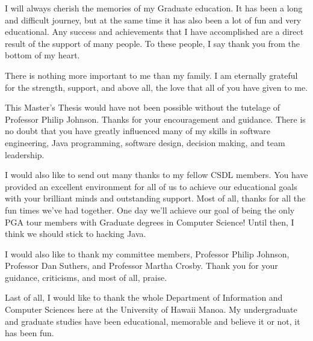 
\begin{acknowledgments}  
I will always cherish the memories of my Graduate education. It has been
a long and difficult journey, but at the same time it has also been a lot
of fun and very educational. Any success and achievements that I have
accomplished are a direct result of the support of many people. To these
people, I say thank you from the bottom of my heart.

There is nothing more important to me than my family. I am eternally
grateful for the strength, support, and above all, the love that all of you
have given to me.

This Master's Thesis would have not been possible without the tutelage of
Professor Philip Johnson. Thanks for your encouragement and guidance. There
is no doubt that you have greatly influenced many of my skills in software
engineering, Java programming, software design, decision making, and team
leadership.

I would also like to send out many thanks to my fellow CSDL members. You
have provided an excellent environment for all of us to achieve our
educational goals with your brilliant minds and outstanding support. Most
of all, thanks for all the fun times we've had together. One day we'll
achieve our goal of being the only PGA tour members with Graduate degrees
in Computer Science! Until then, I think we should stick to hacking Java.

I would also like to thank my committee members, Professor Philip Johnson,
Professor Dan Suthers, and Professor Martha Crosby. Thank you for your
guidance, criticisms, and most of all, praise.

Last of all, I would like to thank the whole Department of Information and
Computer Sciences here at the University of Hawaii Manoa. My undergraduate
and graduate studies have been educational, memorable and believe it or
not, it has been fun. 
\end{acknowledgments}
